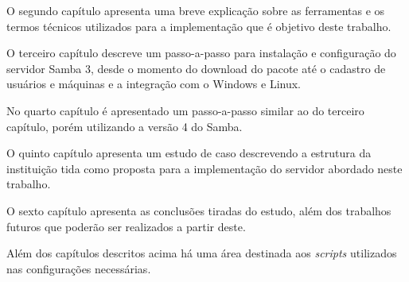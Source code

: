 O segundo capítulo apresenta uma breve explicação sobre as ferramentas e os termos técnicos utilizados para a implementação que é objetivo deste trabalho. 

O terceiro capítulo descreve um passo-a-passo para instalação e configuração do servidor Samba 3, desde o momento do download do pacote até o cadastro de usuários e máquinas e a integração com o Windows e Linux.

No quarto capítulo é apresentado um passo-a-passo similar ao do terceiro capítulo, porém utilizando a versão 4 do Samba.

O quinto capítulo apresenta um estudo de caso descrevendo a estrutura da instituição tida como proposta para a implementação do servidor abordado neste trabalho.

O sexto capítulo apresenta as conclusões tiradas do estudo, além dos trabalhos futuros que poderão ser realizados a partir deste.

Além dos capítulos descritos acima há uma área destinada aos \textit{scripts} utilizados nas configurações necessárias.